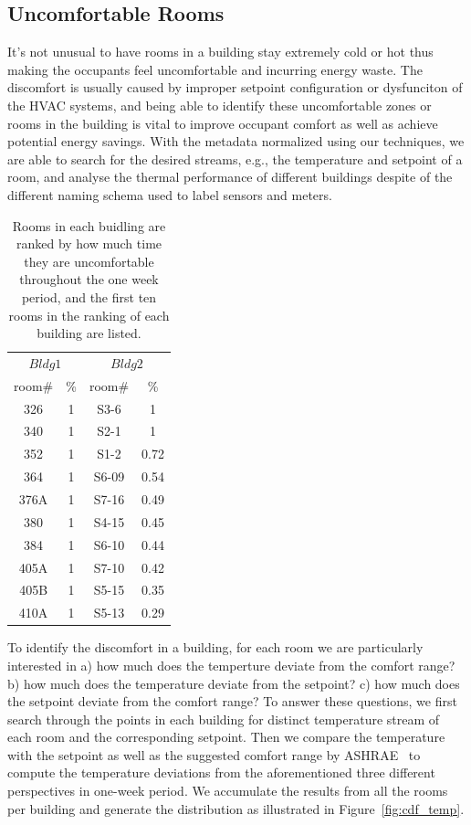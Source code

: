 \subsection{Uncomfortable Rooms}
It's not unusual to have rooms in a building stay extremely cold or hot thus making the occupants feel uncomfortable and incurring energy waste. The discomfort is usually caused by improper setpoint configuration or dysfunciton of the HVAC systems, and being able to identify these uncomfortable zones or rooms in the building is vital to improve occupant comfort as well as achieve potential energy savings. With the metadata normalized using our techniques, we are able to search for the desired streams, e.g., the temperature and setpoint of a room, and analyse the thermal performance of different buildings despite of the different naming schema used to label sensors and meters.

\begin{table}[ht!]
 \begin{center}
	\begin{tabular}{|c|c|c|c|}
	\multicolumn{2}{c}{$Bldg 1$}
	 & \multicolumn{2}{c}{$Bldg 2$}\\
	\cline{1-4} 
	 room\# & \% & room\# & \%\\
	\cline{1-4}
	 326 & 1 & S3-6 & 1\\
	\cline{1-4}
	 340 & 1 & S2-1 & 1\\
	\cline{1-4}
	352 & 1 & S1-2 & 0.72\\
	\cline{1-4}
	364 & 1 & S6-09 & 0.54\\
	\cline{1-4}
	376A & 1 & S7-16 & 0.49\\
	\cline{1-4}
	380 & 1 & S4-15 & 0.45\\
	\cline{1-4}
	384 & 1 & S6-10 & 0.44\\
	\cline{1-4}
	405A & 1 & S7-10 & 0.42\\
	\cline{1-4}
	405B & 1 & S5-15 & 0.35\\
	\cline{1-4}
	410A & 1 & S5-13 & 0.29\\
	\cline{1-4}
	\end{tabular}
 \end{center}
 \caption{Rooms in each buidling are ranked by how much time they are uncomfortable throughout the one week period, and the first ten rooms in the ranking of each building are listed.}
 \label{tab:uncmft}
\end{table}

To identify the discomfort in a building, for each room we are particularly interested in a) how much does the temperture deviate from the comfort range? b) how much does the temperature deviate from the setpoint? c) how much does the setpoint deviate from the comfort range? To answer these questions, we first search through the points in each building for distinct temperature stream of each room and the corresponding setpoint. Then we compare the temperature with the setpoint as well as the suggested comfort range by ASHRAE~\cite{} to compute the temperature deviations from the aforementioned three different perspectives in one-week period. We accumulate the results from all the rooms per building and generate the distribution as illustrated in Figure~\ref{fig:cdf_temp}.


